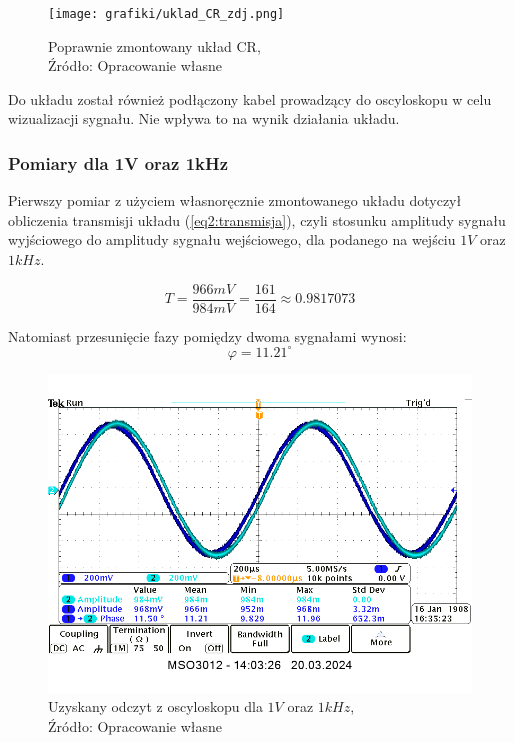 \documentclass{article}
\begin{document}
        \begin{figure}[!ht]
          \centering
          \texttt{[image: grafiki/uklad\_CR\_zdj.png]}
          \caption{Poprawnie zmontowany układ CR,
              \\Źródło: Opracowanie własne}
        \end{figure}
        Do układu został również podłączony kabel prowadzący do oscyloskopu w celu wizualizacji sygnału. Nie wpływa to na wynik działania układu.
        
      \subsubsection{Pomiary dla 1V oraz 1kHz}
        Pierwszy pomiar z użyciem własnoręcznie zmontowanego układu dotyczył obliczenia transmisji układu (\ref{eq2:transmisja}), czyli stosunku amplitudy sygnału wyjściowego do amplitudy sygnału wejściowego, dla podanego na wejściu $1V$ oraz $1kHz$.

        \begin{equation}
          T = \frac{966mV}{984mV} = \frac{161}{164} \approx \mathbf{0.9817073}
        \end{equation}

        Natomiast przesunięcie fazy pomiędzy dwoma sygnałami wynosi:
        \begin{equation}
          \varphi = \mathbf{11.21^\circ}
        \end{equation}

        \begin{figure}[!ht]
          \centering
          \includegraphics[scale=0.5]{grafiki/1V_1kHz_sin_Overall_look.png}
          \caption{Uzyskany odczyt z oscyloskopu dla $1V$ oraz $1kHz$,
              \\Źródło: Opracowanie własne}
        \end{figure}
\end{document}
